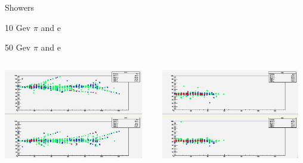 \documentclass[10pt]{beamer}
\begin{document}
\begin{frame}{Showers}
\begin{block}{10 Gev $\pi$ and e}
  \end{block}
  \begin{block}{50 Gev $\pi$ and e}
    \begin{columns}
      \begin{column}{0.5\textwidth}
        \centerline{\includegraphics[width=0.95\textwidth]{jpg/50GevPion.jpg}}
      \end{column}
      \begin{column}{0.5\textwidth}
        \centerline{\includegraphics[width=0.95\textwidth]{jpg/50GevElectron.jpg}}
      \end{column}
    \end{columns}

  \end{block}

\end{frame}
\end{document}
